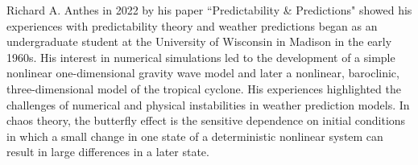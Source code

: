 Richard A. Anthes in 2022 by his paper ``Predictability \& Predictions" showed his experiences with predictability theory and weather predictions began as an undergraduate student at the University of Wisconsin in Madison in the early 1960s. His interest in numerical simulations led to the development of a simple nonlinear one-dimensional gravity wave model and later a nonlinear, baroclinic, three-dimensional model of the tropical cyclone. His experiences highlighted the challenges of numerical and physical instabilities in weather prediction models\cite{atmos13081292, encyclopedia2030084}.
In chaos theory, the butterfly effect is the sensitive dependence on initial conditions in which a small change in one state of a deterministic nonlinear system can result in large differences in a later state.